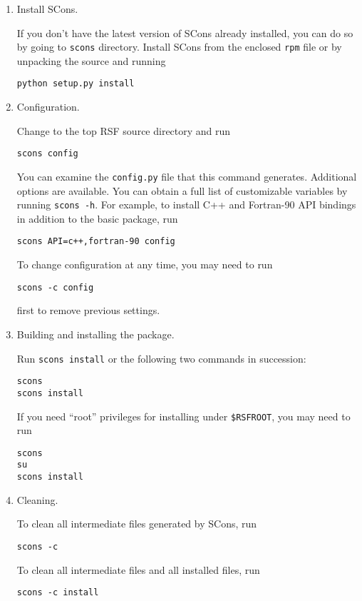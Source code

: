 \begin{enumerate}

\item Install SCons.

If you don't have the latest version of SCons already installed, you can do so
by going to \texttt{scons} directory. Install SCons from the enclosed
\texttt{rpm} file or by unpacking the source and running 
\begin{verbatim}
python setup.py install
\end{verbatim}

\item Configuration.

Change to the top RSF source directory and run
\begin{verbatim}
scons config
\end{verbatim}

You can examine the \texttt{config.py} file that this command
generates.  Additional options are available. You can obtain a full
list of customizable variables by running \texttt{scons -h}. For
example, to install C++ and Fortran-90 API bindings in addition to the
basic package, run
\begin{verbatim}
scons API=c++,fortran-90 config
\end{verbatim}

To change configuration at any time, you may need to run 
\begin{verbatim}
scons -c config
\end{verbatim}
first to remove previous settings.

\item Building and installing the package.

Run \texttt{scons install} or the following two commands in succession: 
\begin{verbatim}
scons
scons install
\end{verbatim}

If you need ``root'' privileges for installing under \texttt{\$RSFROOT}, you may need to run
\begin{verbatim}
scons
su
scons install
\end{verbatim}

\item Cleaning.

To clean all intermediate files generated by SCons, run
\begin{verbatim}
scons -c
\end{verbatim}

To clean all intermediate files and all installed files, run
\begin{verbatim}
scons -c install
\end{verbatim}

\end{enumerate}

